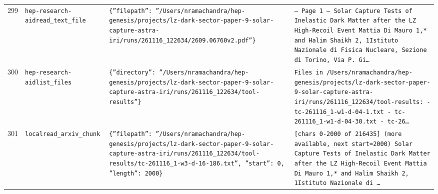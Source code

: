 \documentclass[11pt,a4paper]{article}
\begin{document}
\begin{longtable}{@{}p{}p{}p{}p{}@{}}
299 & \texttt{hep-research-aid}\newline\texttt{read\_\allowbreak{}text\_\allowbreak{}file} & \texttt{\{''filepath'':\allowbreak{} ''/\allowbreak{}Users/\allowbreak{}nramachandra/\allowbreak{}hep-genesis/\allowbreak{}projects/\allowbreak{}lz-dark-sector-paper-9-solar-capture-astra-iri/\allowbreak{}runs/\allowbreak{}261116\_\allowbreak{}122634/\allowbreak{}2609.06760v2.pdf''\}\allowbreak{}} & \texttt{--- Page 1 --- Solar Capture Tests of Inelastic Dark Matter after the LZ High-Recoil Event Mattia Di Mauro 1,\allowbreak{}* and Halim Shaikh 2,\allowbreak{}\dag{}\allowbreak{} 1Istituto Nazionale di Fisica Nucleare,\allowbreak{} Sezione di Torino,\allowbreak{} Via P. Gi\ldots{}\allowbreak{}} \\
300 & \texttt{hep-research-aid}\newline\texttt{list\_\allowbreak{}files} & \texttt{\{''directory'':\allowbreak{} ''/\allowbreak{}Users/\allowbreak{}nramachandra/\allowbreak{}hep-genesis/\allowbreak{}projects/\allowbreak{}lz-dark-sector-paper-9-solar-capture-astra-iri/\allowbreak{}runs/\allowbreak{}261116\_\allowbreak{}122634/\allowbreak{}tool-results''\}\allowbreak{}} & \texttt{Files in /\allowbreak{}Users/\allowbreak{}nramachandra/\allowbreak{}hep-genesis/\allowbreak{}projects/\allowbreak{}lz-dark-sector-paper-9-solar-capture-astra-iri/\allowbreak{}runs/\allowbreak{}261116\_\allowbreak{}122634/\allowbreak{}tool-results:\allowbreak{}   - tc-261116\_\allowbreak{}1-w1-d-04-1.txt   - tc-261116\_\allowbreak{}1-w1-d-04-30.txt   - tc-26\ldots{}\allowbreak{}} \\
301 & \texttt{local}\newline\texttt{read\_\allowbreak{}arxiv\_\allowbreak{}chunk} & \texttt{\{''filepath'':\allowbreak{} ''/\allowbreak{}Users/\allowbreak{}nramachandra/\allowbreak{}hep-genesis/\allowbreak{}projects/\allowbreak{}lz-dark-sector-paper-9-solar-capture-astra-iri/\allowbreak{}runs/\allowbreak{}261116\_\allowbreak{}122634/\allowbreak{}tool-results/\allowbreak{}tc-261116\_\allowbreak{}1-w3-d-16-186.txt'',\allowbreak{} ''start'':\allowbreak{} 0,\allowbreak{} ''length'':\allowbreak{} 2000\}\allowbreak{}} & \texttt{[chars 0-2000 of 216435]\allowbreak{} (more available,\allowbreak{} next start=\allowbreak{}2000)\allowbreak{}  Solar Capture Tests of Inelastic Dark Matter after the LZ High-Recoil Event Mattia Di Mauro 1,\allowbreak{}* and Halim Shaikh 2,\allowbreak{}\dag{}\allowbreak{} 1Istituto Nazionale di \ldots{}\allowbreak{}} \\

\end{longtable}
\end{document}
